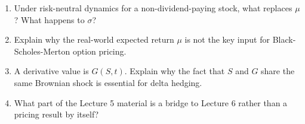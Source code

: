 \begin{enumerate}
    median stock price.
    \item Under risk-neutral dynamics for a non-dividend-paying stock, what
    replaces $\mu$? What happens to $\sigma$?
    \item Explain why the real-world expected return $\mu$ is not the key input
    for Black-Scholes-Merton option pricing.
    \item A derivative value is $G(S,t)$. Explain why the fact that $S$ and $G$
    share the same Brownian shock is essential for delta hedging.
    \item What part of the Lecture 5 material is a bridge to Lecture 6 rather
    than a pricing result by itself?
\end{enumerate}


